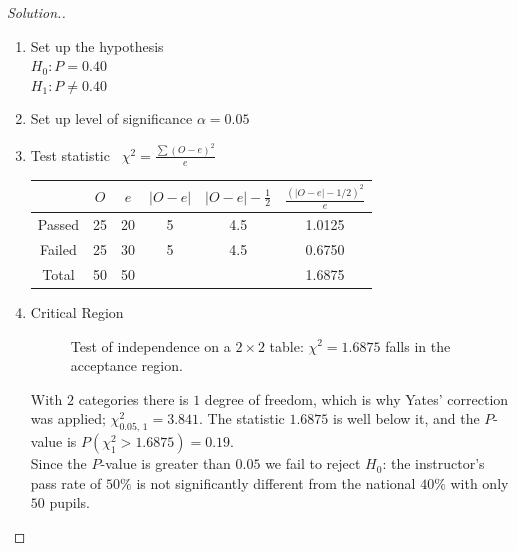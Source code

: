 \documentclass[11pt,a4paper]{article}
\theoremstyle{definition}
\newenvironment{solution}
  {\renewcommand{\qedsymbol}{}\begin{proof}[\textit{Solution}.]}
  {\end{proof}}
\begin{document}
\begin{solution}
\begin{enumerate}
\item Set up the hypothesis\\
$H_0: P=0.40$\\
$H_1: P\neq 0.40$

\item Set up level of significance $\alpha =0.05$
\item Test statistic \ $\chi^2=\frac{\sum (O-e)^2}{e}$

\begin{table}[H]
\centering
\begin{tabular}{|c|c|c|c|c|c|}
\hline & $O$ & $e$ & $|O-e|$ & $|O-e|-\frac{1}{2}$ & $\frac{(|O-e|-1/2)^2}{e}$\\
\hline Passed & 25 &20 & 5 & 4.5 & 1.0125\\
Failed & 25 & 30 & 5 & 4.5 & 0.6750\\
\hline Total & 50 & 50 &&& 1.6875\\
\hline
\end{tabular}
\end{table}

\item Critical Region




\begin{figure}[H]
\centering
{}
\caption{Test of independence on a $2\times 2$ table: $\chi^2=1.6875$ falls in the acceptance region.}
\end{figure}









With $2$ categories there is $1$ degree of freedom, which is why Yates' correction was applied; $\chi^2_{0.05,\,1}=3.841$. The statistic $1.6875$ is well below it, and the $P$-value is $P(\chi^2_1>1.6875)=0.19$.\\
Since the $P$-value is greater than $0.05$ we fail to reject $H_0$: the instructor's pass rate of $50\%$ is not significantly different from the national $40\%$ with only $50$ pupils.\\
\end{enumerate}
\end{solution}
\end{document}
